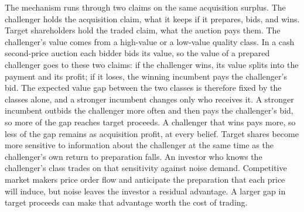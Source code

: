 The mechanism runs through two claims on the same acquisition surplus.
The challenger holds the acquisition claim, what it keeps if it
prepares, bids, and wins. Target shareholders hold the traded claim,
what the auction pays them. The challenger's value comes from a
high-value or a low-value quality class. In a cash second-price auction
each bidder bids its value, so the value of a prepared challenger goes
to these two claims: if the challenger wins, its value splits into the
payment and its profit; if it loses, the winning incumbent pays the
challenger's bid. The expected value gap between the two classes is
therefore fixed by the classes alone, and a stronger incumbent changes
only who receives it. A stronger incumbent outbids the challenger more
often and then pays the challenger's bid, so more of the gap reaches
target proceeds. A challenger that wins pays more, so less of the gap
remains as acquisition profit, at every belief. Target shares become
more sensitive to information about the challenger at the same time as
the challenger's own return to preparation falls. An investor who knows
the challenger's class trades on that sensitivity against noise demand.
Competitive market makers price order flow and anticipate the
preparation that each price will induce, but noise leaves the investor a
residual advantage. A larger gap in target proceeds can make that
advantage worth the cost of trading.
